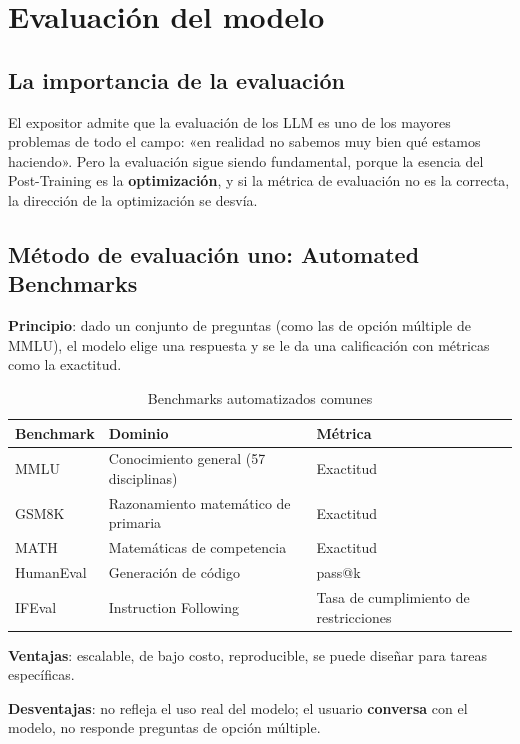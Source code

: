 \section{Evaluación del modelo}

\subsection{La importancia de la evaluación}

El expositor admite que la evaluación de los LLM es uno de los mayores problemas de todo el campo: «en realidad no sabemos muy bien qué estamos haciendo». Pero la evaluación sigue siendo fundamental, porque la esencia del Post-Training es la \textbf{optimización}, y si la métrica de evaluación no es la correcta, la dirección de la optimización se desvía.

\subsection{Método de evaluación uno: Automated Benchmarks}

\textbf{Principio}: dado un conjunto de preguntas (como las de opción múltiple de MMLU), el modelo elige una respuesta y se le da una calificación con métricas como la exactitud.

\begin{table}[H]
\centering
\caption{Benchmarks automatizados comunes}
\begin{tabular}{lll}
\toprule
\textbf{Benchmark} & \textbf{Dominio} & \textbf{Métrica} \\
\midrule
MMLU & Conocimiento general (57 disciplinas) & Exactitud \\
GSM8K & Razonamiento matemático de primaria & Exactitud \\
MATH & Matemáticas de competencia & Exactitud \\
HumanEval & Generación de código & pass@k \\
IFEval & Instruction Following & Tasa de cumplimiento de restricciones \\
\bottomrule
\end{tabular}
\end{table}

\textbf{Ventajas}: escalable, de bajo costo, reproducible, se puede diseñar para tareas específicas.

\textbf{Desventajas}: no refleja el uso real del modelo; el usuario \textbf{conversa} con el modelo, no responde preguntas de opción múltiple.

